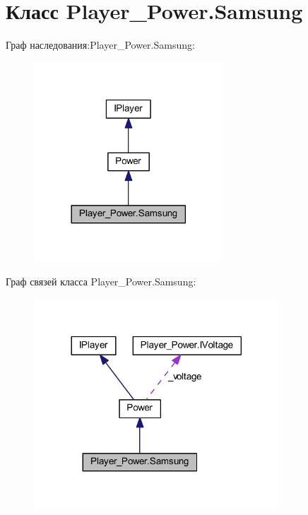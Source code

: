 \section{Класс Player\-\_\-\-Power.\-Samsung}
\label{class_player___power_1_1_samsung}


Граф наследования\-:Player\-\_\-\-Power.\-Samsung\-:
\nopagebreak
\begin{figure}[H]
\begin{center}
\leavevmode
\includegraphics[width=201pt]{class_player___power_1_1_samsung__inherit__graph}
\end{center}
\end{figure}


Граф связей класса Player\-\_\-\-Power.\-Samsung\-:
\nopagebreak
\begin{figure}[H]
\begin{center}
\leavevmode
\includegraphics[width=260pt]{class_player___power_1_1_samsung__coll__graph}
\end{center}
\end{figure}

